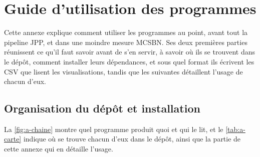 \section{Guide d'utilisation des programmes}
\label{ann:guide}


\setlength{\emergencystretch}{3em}

Cette annexe explique comment utiliser les programmes au point, avant tout la pipeline JPP, et dans une moindre mesure MCSBN.
Ses deux premières parties réunissent ce qu'il faut savoir avant de s'en servir, à savoir où ils se trouvent dans le dépôt, comment installer leurs dépendances, et sous quel format ils écrivent les CSV que lisent les visualisations, tandis que les suivantes détaillent l'usage de chacun d'eux.

\subsection{Organisation du dépôt et installation}
\label{ann:a-chaine}

La \cref{fig:a-chaine} montre quel programme produit quoi et qui le lit, et le \cref{tab:a-carte} indique où se trouve chacun d'eux dans le dépôt, ainsi que la partie de cette annexe qui en détaille l'usage.

